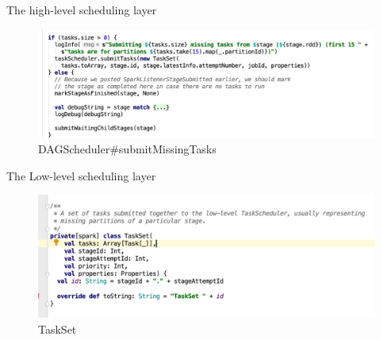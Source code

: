 \begin{frame}[plain,t]{The high-level scheduling layer} %
	 \\  \vspace{2ex}
	\begin{figure}
		\centering
		\includegraphics[width=1\linewidth]{images/dag005}
		\caption{DAGScheduler\#submitMissingTasks}
		\label{fig:dag005}
	\end{figure}
\end{frame}

\begin{frame}[plain,t]{The Low-level scheduling layer} %
	 \\  \vspace{2ex}
	\begin{figure}
		\centering
		\includegraphics[width=0.9\linewidth]{images/taskset001}
		\caption{TaskSet}
		\label{fig:taskset001}
	\end{figure}
	
\end{frame}

